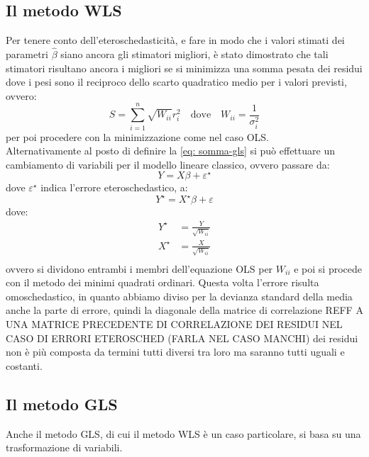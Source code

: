 \documentclass[]{article}
\begin{document}
\subsection{Il metodo WLS}
Per tenere conto dell'eteroschedasticità, e fare in modo che i valori stimati dei parametri $\hat{\beta}$ siano ancora gli stimatori migliori, è stato dimostrato che tali stimatori risultano ancora i migliori se si minimizza una somma pesata dei residui dove i pesi sono il reciproco dello scarto quadratico medio per i valori previsti, ovvero:
\begin{equation}
S = \sum_{i=1}^{n} \sqrt{W_{ii}} r_i^2 \quad \text{dove}\quad W_{ii} = \frac{1}{\sigma_i^2} 
\label{eq: somma-gls}
\end{equation}
per poi procedere con la minimizzazione come nel caso OLS. \\
Alternativamente al posto di definire la \eqref{eq: somma-gls} si può effettuare un cambiamento di variabili per il modello lineare classico, ovvero passare da:
\begin{equation}
Y = X\beta + \varepsilon^\star
\label{eq: regressione-lineare-eterosched}
\end{equation} 
dove $\varepsilon^\star$ indica l'errore eteroschedastico, a:
\begin{equation}
Y^\star = X^\star\beta + \varepsilon
\end{equation}
dove:
\begin{equation}
\begin{split}
Y^\star &= \frac{Y}{\sqrt{W_{ii}}} \\
X^\star &= \frac{X}{\sqrt{W_{ii}}} \\
\end{split}
\end{equation}
ovvero si dividono entrambi i membri dell'equazione OLS per $W_{ii}$ e poi si procede con il metodo dei minimi quadrati ordinari. Questa volta l'errore risulta omoschedastico, in quanto abbiamo diviso per la devianza standard della media anche la parte di errore, quindi la diagonale della matrice di correlazione REFF A UNA MATRICE PRECEDENTE DI CORRELAZIONE DEI RESIDUI NEL CASO DI ERRORI ETEROSCHED (FARLA NEL CASO MANCHI) dei residui non è più composta da termini tutti diversi tra loro ma saranno tutti uguali e costanti.
\subsection{Il metodo GLS}
Anche il metodo GLS, di cui il metodo WLS è un caso particolare, si basa su una trasformazione di variabili.
\end{document}
